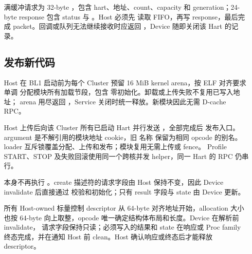 \documentclass[../dayan_kernel_manual.tex]{subfiles}
\begin{document}
满缓冲请求为 32-byte ，包含 hart、地址、count、capacity
和 generation；24-byte response 包含 status 与 。Host 必须先
读取 FIFO，再写 response，最后完成 packet。回调或队列无法继续接收时应返回
，Device 随即关闭该 Hart 的记录。

\subsection{发布新代码}

Host 在 BL1 启动前为每个 Cluster 预留 16 MiB kernel arena，按 ELF 对齐要求单调
分配模块所有加载节段，包含  零初始化。卸载或上传失败不复用已写入地址；
arena 用尽返回 ，Service 关闭时统一释放。新模块因此无需 D-cache RPC。

Host 上传后向该 Cluster 所有已启动 Hart 并行发送 ，全部完成后
发布入口。argument 是不解引用的模块地址 cookie，旧  名称
保留为相同 opcode 的别名。loader 互斥锁覆盖分配、上传和发布；模块复用无需上传或 fence。
Profile START、STOP 及失败回滚使用同一个跨核并发 helper，同一 Hart 的 RPC 仍串行。

 本身不再执行 。create 描述符的请求字段由 Host
保持不变，因此 Device invalidate 后直接通过  校验和初始化；只有
result 字段与 state 由 Device 更新。

所有 Host-owned 标量控制 descriptor 从 64-byte 对齐地址开始，allocation 大小也按
64-byte 向上取整，opcode 唯一确定结构体布局和长度。Device 在解析前 invalidate，
请求字段保持只读；必须写入的结果和 state 在响应或 Proc family 终态完成，并在通知 Host
前 clean。Host 确认响应或终态后才能释放 descriptor。
\end{document}
